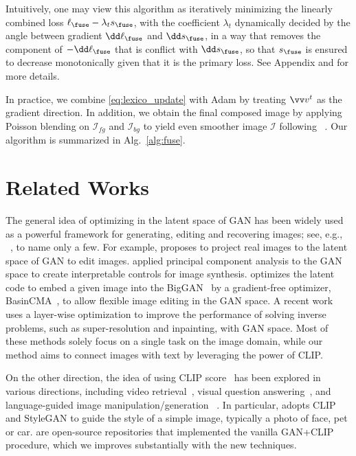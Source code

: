 \documentclass[10pt,twocolumn,letterpaper]{article}
\begin{document}
    Intuitively, one may view this algorithm as iteratively minimizing the linearly combined loss $\ell_{\fuse} - \lambda_t s_\fuse$, with the coefficient  $\lambda_t$ dynamically decided by the angle between gradient $\dd \ell_{\fuse}$ and $\dd s_{\fuse}$, in a way that removes the component of $-\dd \ell_\fuse$ that is conflict with $\dd s_{\fuse}$, so that 
    $s_\fuse$ is ensured to decrease monotonically given that it is the primary loss.   
See Appendix and \cite{gong2021automatic}  for more details. 


In practice, we combine \eqref{eq:lexico_update} with Adam by treating $\vv v^t$ as the gradient direction. In addition, we obtain the final composed image by applying  Poisson blending on $\mathcal{I}_{fg}$ and $\mathcal{I}_{bg}$ to yield even smoother image $\mathcal{I}$ following ~\cite{huh2020transforming}. 
Our algorithm is summarized in Alg.~\ref{alg:fuse}.



\section{Related Works}
The general idea of optimizing in the latent space of GAN has been widely used as a powerful framework 
for generating, editing and recovering images; see, e.g.,  
~\cite{zhu2016generative, harkonen2020ganspace, huh2020transforming, abdal2019image2stylegan}, to name only a few.  
For example, \cite{zhu2016generative} proposes to project real images to the latent space of GAN to edit images. 
\cite{harkonen2020ganspace} applied principal component analysis to the GAN space 
to create interpretable controls for image synthesis. \cite{huh2020transforming} optimizes the latent code to embed a given image into the BigGAN~\cite{brock2018large} by a gradient-free optimizer, BasinCMA~\cite{bau2019seeing, wampler2009optimal}, to allow flexible image editing in the GAN space. 
A recent work~\cite{daras2021intermediate} uses a layer-wise optimization to improve the performance of solving inverse problems, such as super-resolution and inpainting, with GAN space.
Most of these methods solely focus on a single task on the image domain, while our method aims to connect images with text by leveraging the power of CLIP. 


On the other direction, the idea of using CLIP score~\cite{radford2021learning} has been explored in various directions, 
including video retrieval~\cite{luo2021clip4clip}, visual question answering~\cite{shen2021much}, and language-guided image manipulation/generation
~\cite{galatolo2021generating, bigsleep, VQGANCLIP, patashnik2021styleclip}. 
In particular, \cite{patashnik2021styleclip} adopts CLIP and StyleGAN to guide the style of a simple image, typically a photo of face, pet or car.  
\cite{bigsleep, VQGANCLIP, galatolo2021generating} are open-source repositories that implemented the vanilla GAN+CLIP procedure, which we improves substantially with the new techniques. 
\end{document}
